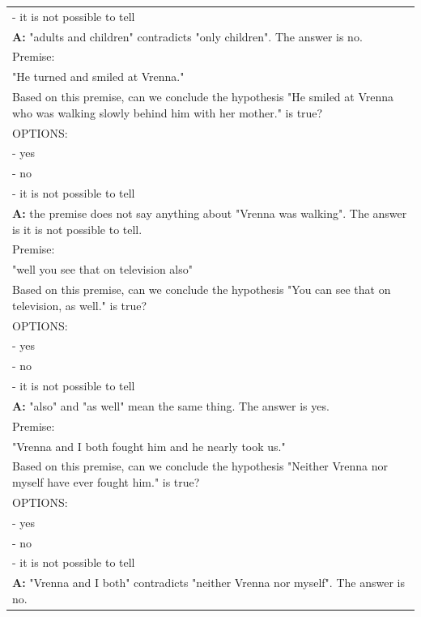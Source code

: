 \documentclass{article} %
\begin{document}
\begin{table}[h]
\begin{tabular}{p{14cm}}
        - it is not possible to tell\\
        \vspace{-1mm}
        \textbf{A:} "adults and children" contradicts "only children". The answer is no.\\
        \vspace{0mm}
        Premise:\\
        "He turned and smiled at Vrenna."\\
        Based on this premise, can we conclude the hypothesis "He smiled at Vrenna who was walking slowly behind him with her mother." is true?\\
        OPTIONS:\\
        - yes\\
        - no\\
        - it is not possible to tell\\
        \vspace{-1mm}
        \textbf{A:} the premise does not say anything about "Vrenna was walking". The answer is it is not possible to tell.\\
        \vspace{0mm}
        Premise:\\
        "well you see that on television also"\\
        Based on this premise, can we conclude the hypothesis "You can see that on television, as well." is true?\\
        OPTIONS:\\
        - yes\\
        - no\\
        - it is not possible to tell\\
        \vspace{-1mm}
        \textbf{A:} "also" and "as well" mean the same thing. The answer is yes.\\
        \vspace{0mm}
        Premise:\\
        "Vrenna and I both fought him and he nearly took us."\\
        Based on this premise, can we conclude the hypothesis "Neither Vrenna nor myself have ever fought him." is true?\\
        OPTIONS:\\
        - yes\\
        - no\\
        - it is not possible to tell\\
        \vspace{-1mm}
        \textbf{A:} "Vrenna and I both" contradicts "neither Vrenna nor myself". The answer is no.\\
        \bottomrule
    \end{tabular}
    \label{tab:prompt-nli}
\end{table}
\end{document}
